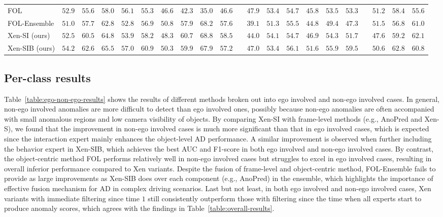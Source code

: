\begin{table*}[t]
\begin{center}
{\begin{tabular}{ l  c  c  c  c  c  c  c  c  c  c  c  c  c  c  c  c  c  c  c  c }
      FOL & $52.9$ & $55.6$ & $58.0$ & $56.1$ & $55.3$ & $46.6$ & $42.3$ & $35.0$ & $46.6$ & & $\mathbf{47.9}$ & $53.4$ & $54.7$ & $45.8$ & $53.5$ & $53.3$ & & $51.2$ & $58.4$ & $55.6$ \\
      FOL-Ensemble & $51.0$ & $57.7$ & $62.8$ & $52.8$ & $56.9$ & $\mathbf{50.8}$ & $57.9$ & $68.2$ & $57.6$ & & $39.1$ & $51.3$ & $55.5$ & $44.8$ & $49.4$ & $47.3$ & & $\mathbf{51.5}$ & $56.8$ & $61.0$ \\
      Xen-SI (ours) & $52.5$ & $60.5$ & $64.8$ & $53.9$ & $58.2$ & $48.3$ & $\mathbf{60.7}$ & $\mathbf{68.8}$ & $\mathbf{58.5}$ & & $44.0$ & $\mathbf{54.1}$ & $54.7$ & $46.9$ & $54.3$ & $51.7$ & & $47.6$ & $59.2$ & $62.1$ \\
      Xen-SIB (ours) & $\mathbf{54.2}$ & $\mathbf{62.6}$ & $\mathbf{65.5}$ & $\mathbf{57.0}$ & $\mathbf{60.9}$ & $50.3$ & $59.9$ & $67.9$ & $57.2$ & & $47.0$ & $53.4$ & $\mathbf{56.1}$ & $\mathbf{51.6}$ & $\mathbf{55.9}$ & $\mathbf{59.5}$ & & $50.6$ & $\mathbf{62.8}$ & $60.8$ \\
      \bottomrule
    \end{tabular}}
  \end{center}
\end{table*}

\subsection{Per-class results}
Table~\ref{table:ego-non-ego-results} shows the results of different methods broken out into ego involved and non-ego involved cases. In general, non-ego involved anomalies are more difficult to detect than ego involved ones, possibly because non-ego anomalies are often accompanied with small anomalous regions and low camera visibility of objects. By comparing Xen-SI with frame-level methods (e.g., AnoPred and Xen-S), we found that the improvement in non-ego involved cases is much more significant than that in ego involved cases, which is expected since the interaction expert mainly enhances the object-level AD performance. A similar improvement is observed when further including the behavior expert in Xen-SIB, which achieves the best AUC and F1-score in both ego involved and non-ego involved cases. By contrast, the object-centric method FOL performs relatively well in non-ego involved cases but struggles to excel in ego involved cases, resulting in overall inferior performance compared to Xen variants. Despite the fusion of frame-level and object-centric method, FOL-Ensemble fails to provide as large improvements as Xen-SIB does over each component (e.g., AnoPred) in the ensemble, which highlights the importance of effective fusion mechanism for AD in complex driving scenarios. Last but not least, in both ego involved and non-ego involved cases, Xen variants with immediate filtering since time $1$ still consistently outperform those with filtering since the time when all experts start to produce anomaly scores, which agrees with the findings in Table~\ref{table:overall-results}.

